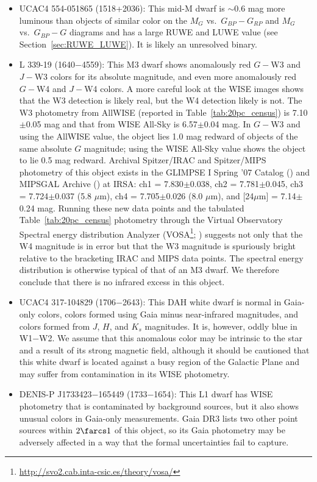 \documentclass[twocolumn,tighten,twocolappendix]{aastex631}
\begin{document}
\begin{itemize}
\item UCAC4 554-051865 (1518+2036): This mid-M dwarf 
is $\sim$0.6 mag more luminous than objects of similar color on the $M_G$ vs.\ $G_{BP}-G_{RP}$ and $M_G$ vs.\ $G_{BP}-G$ diagrams and has a large RUWE and LUWE value (see Section~\ref{sec:RUWE_LUWE}). It is likely an unresolved binary.

\item L 339-19 (1640$-$4559): This M3 dwarf shows anomalously red $G-$W3 and $J-$W3 colors for its absolute magnitude, and even more anomalously red $G-$W4 and $J-$W4 colors. A more careful look at the WISE images shows that the W3 detection is likely real, but the W4 detection likely is not. The W3 photometry from AllWISE (reported in Table~\ref{tab:20pc_census}) is 7.10$\pm$0.05 mag and that from WISE All-Sky is 6.57$\pm$0.04 mag. In $G-$W3 and using the AllWISE value, the object lies 1.0 mag redward of objects of the same absolute $G$ magnitude; using the WISE All-Sky value shows the object to lie 0.5 mag redward. Archival Spitzer/IRAC and Spitzer/MIPS photometry of this object exists in the GLIMPSE I Spring '07 Catalog (\citealt{benjamin2003}) and MIPSGAL Archive (\citealt{carey2009}) at IRSA: ch1 = 7.830$\pm$0.038, ch2 = 7.781$\pm$0.045, ch3 = 7.724$\pm$0.037 (5.8 $\mu$m), ch4 = 7.705$\pm$0.026 (8.0 $\mu$m), and [24$\mu$m] = 7.14$\pm$0.24 mag. Running these new data points and the tabulated Table~\ref{tab:20pc_census} photometry through the Virtual Observatory Spectral energy distribution Analyzer (VOSA\footnote{\url{http://svo2.cab.inta-csic.es/theory/vosa/}}; \citealt{bayo2008}) suggests not only that the W4 magnitude is in error but that the W3 magnitude is spuriously bright relative to the bracketing IRAC and MIPS data points. The spectral energy distribution is otherwise typical of that of an M3 dwarf. We therefore conclude that there is no infrared excess in this object.

\item UCAC4 317-104829 (1706$-$2643): This DAH white dwarf is normal in Gaia-only colors, colors formed using Gaia minus near-infrared magnitudes, and colors formed from $J$, $H$, and $K_s$ magnitudes. It is, however, oddly blue in W1$-$W2. We assume that this anomalous color may be intrinsic to the star and a result of its strong magnetic field, although it should be cautioned that this white dwarf is located against a busy region of the Galactic Plane and may suffer from contamination in its WISE photometry.

\item DENIS-P J1733423$-$165449 (1733$-$1654): This L1 dwarf has WISE photometry that is contaminated by background sources, but it also shows unusual colors in Gaia-only measurements. Gaia DR3 lists two other point sources within $2{\farcs}1$ of this object, so its Gaia photometry may be adversely affected in a way that the formal uncertainties fail to capture.


\end{itemize}
\end{document}
